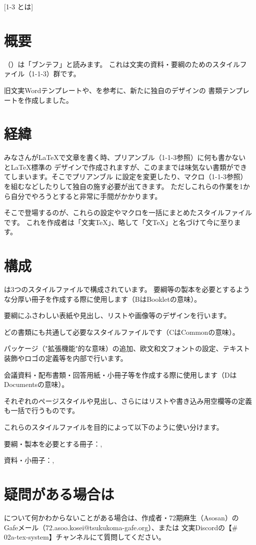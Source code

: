 \newpage
\pagestyle{booklet}
[1-3 \BunTeX とは]
\inserttitlespace
\begin{multicols*}{2}
\section{概要}
\BunTeX （\BunTeXJ ）は「ブンテフ」と読みます。
これは文実の資料・要綱のためのスタイルファイル（1-1-3）群です。

旧文実Wordテンプレートや、を参考に、新たに独自のデザインの
書類テンプレートを作成しました。

\section{経緯}
みなさんが\LaTeX で文章を書く時、プリアンブル（1-1-3参照）に何も書かないと\LaTeX 標準の
デザインで作成されますが、このままでは味気ない書類ができてしまいます。そこでプリアンブル
に設定を変更したり、マクロ（1-1-3参照）を組むなどしたりして独自の施す必要が出てきます。
ただしこれらの作業を1から自分でやろうとすると非常に手間がかかります。

そこで登場するのが、これらの設定やマクロを一括にまとめたスタイルファイルです。
これを作成者は「文実\TeX 」、略して「文\TeX 」と名づけて今に至ります。

\section{構成}
\BunTeX は3つのスタイルファイルで構成されています。
要綱等の製本を必要とするような分厚い冊子を作成する際に使用します（BはBookletの意味）。

要綱にふさわしい表紙や見出し、リストや画像等のデザインを行います。

どの書類にも共通して必要なスタイルファイルです（CはCommonの意味）。

パッケージ（"拡張機能"的な意味）の追加、欧文和文フォントの設定、テキスト装飾やロゴの定義等を内部で行います。

会議資料・配布書類・回答用紙・小冊子等を作成する際に使用します（DはDocumentsの意味）。

それぞれのページスタイルや見出し、さらにはリストや書き込み用空欄等の定義も一括で行うものです。

これらのスタイルファイルを目的によって以下のように使い分けます。
\begin{framebox-key}
\begin{reitemize}
    \item 要綱・製本を必要とする冊子：\BunTeXB , \BunTeXC
    \item 資料・小冊子：\BunTeXC , \BunTeXD
\end{reitemize}
\end{framebox-key}

\section{疑問がある場合は}
\BunTeX について何かわからないことがある場合は、作成者・72期麻生（Asosan）のGafeメール（72.asoo.kosei@tsukukoma-gafe.org）、または
文実Discordの【\# 02a-tex-system】チャンネルにて質問してください。

\end{multicols*}
